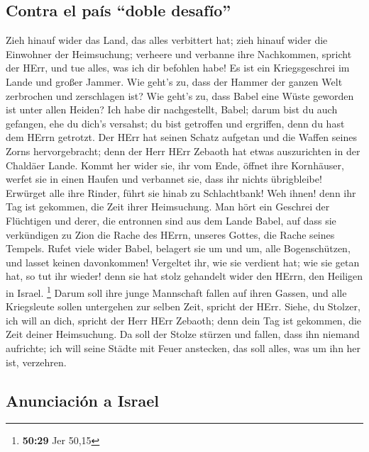 \hypertarget{contra-el-pauxeds-doble-desafuxedo}{%
\subsection{Contra el país ``doble
desafío''}\label{contra-el-pauxeds-doble-desafuxedo}}

 Zieh hinauf wider das Land, das alles verbittert hat;
zieh hinauf wider die Einwohner der Heimsuchung; verheere und verbanne
ihre Nachkommen, spricht der HErr, und tue alles, was ich dir befohlen
habe!  Es ist ein Kriegsgeschrei im Lande und großer
Jammer.  Wie geht's zu, dass der Hammer der ganzen Welt
zerbrochen und zerschlagen ist? Wie geht's zu, dass Babel eine Wüste
geworden ist unter allen Heiden?  Ich habe dir
nachgestellt, Babel; darum bist du auch gefangen, ehe du dich's
versahst; du bist getroffen und ergriffen, denn du hast dem HErrn
getrotzt.  Der HErr hat seinen Schatz aufgetan und die
Waffen seines Zorns hervorgebracht; denn der Herr HErr Zebaoth hat etwas
auszurichten in der Chaldäer Lande.  Kommt her wider sie,
ihr vom Ende, öffnet ihre Kornhäuser, werfet sie in einen Haufen und
verbannet sie, dass ihr nichts übrigbleibe!  Erwürget
alle ihre Rinder, führt sie hinab zu Schlachtbank! Weh ihnen! denn ihr
Tag ist gekommen, die Zeit ihrer Heimsuchung.  Man hört
ein Geschrei der Flüchtigen und derer, die entronnen sind aus dem Lande
Babel, auf dass sie verkündigen zu Zion die Rache des HErrn, unseres
Gottes, die Rache seines Tempels.  Rufet viele wider
Babel, belagert sie um und um, alle Bogenschützen, und lasset keinen
davonkommen! Vergeltet ihr, wie sie verdient hat; wie sie getan hat, so
tut ihr wieder! denn sie hat stolz gehandelt wider den HErrn, den
Heiligen in Israel. \footnote{\textbf{50:29} Jer 50,15} 
Darum soll ihre junge Mannschaft fallen auf ihren Gassen, und alle
Kriegsleute sollen untergehen zur selben Zeit, spricht der HErr.
 Siehe, du Stolzer, ich will an dich, spricht der Herr
HErr Zebaoth; denn dein Tag ist gekommen, die Zeit deiner Heimsuchung.
 Da soll der Stolze stürzen und fallen, dass ihn niemand
aufrichte; ich will seine Städte mit Feuer anstecken, das soll alles,
was um ihn her ist, verzehren.

\hypertarget{anunciaciuxf3n-a-israel}{%
\subsection{Anunciación a Israel}\label{anunciaciuxf3n-a-israel}}

